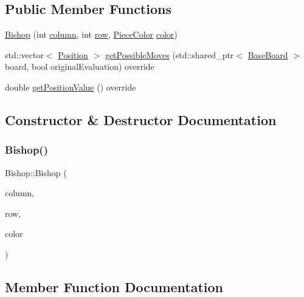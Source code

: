 \subsection*{Public Member Functions}
\begin{DoxyCompactItemize}
\item 
\hyperlink{class_bishop_a7f1bb8d03cbb6e65697cd99f2a3454f4}{Bishop} (int \hyperlink{class_piece_aa8f39e11280395103164f6ae07398c82}{column}, int \hyperlink{class_piece_ac6ef7c474f20562cb629c2452ce0631d}{row}, \hyperlink{_piece_8h_ad7595c48bb74c0dd2a7648712a2d4985}{Piece\+Color} \hyperlink{class_piece_a8dfe0501fe95a1a7618cf5ad3b9fda69}{color})
\item 
std\+::vector$<$ \hyperlink{struct_position}{Position} $>$ \hyperlink{class_bishop_ab2f9cc1a56bc42fc019ba6edcb4b8426}{get\+Possible\+Moves} (std\+::shared\+\_\+ptr$<$ \hyperlink{class_base_board}{Base\+Board} $>$ board, bool original\+Evaluation) override
\item 
double \hyperlink{class_bishop_a03f53aab9a31cf09c3d252053231eedc}{get\+Position\+Value} () override
\end{DoxyCompactItemize}


\subsection{Constructor \& Destructor Documentation}
\mbox{\label{class_bishop_a7f1bb8d03cbb6e65697cd99f2a3454f4}} 
\subsubsection{\texorpdfstring{Bishop()}{Bishop()}}
{\footnotesize\ttfamily Bishop\+::\+Bishop (\begin{DoxyParamCaption}\item[{int}]{column,  }\item[{int}]{row,  }\item[{\hyperlink{_piece_8h_ad7595c48bb74c0dd2a7648712a2d4985}{Piece\+Color}}]{color }\end{DoxyParamCaption})\hspace{0.3cm}{\ttfamily [inline]}}



\subsection{Member Function Documentation}
\mbox{\label{class_bishop_a03f53aab9a31cf09c3d252053231eedc}} 
